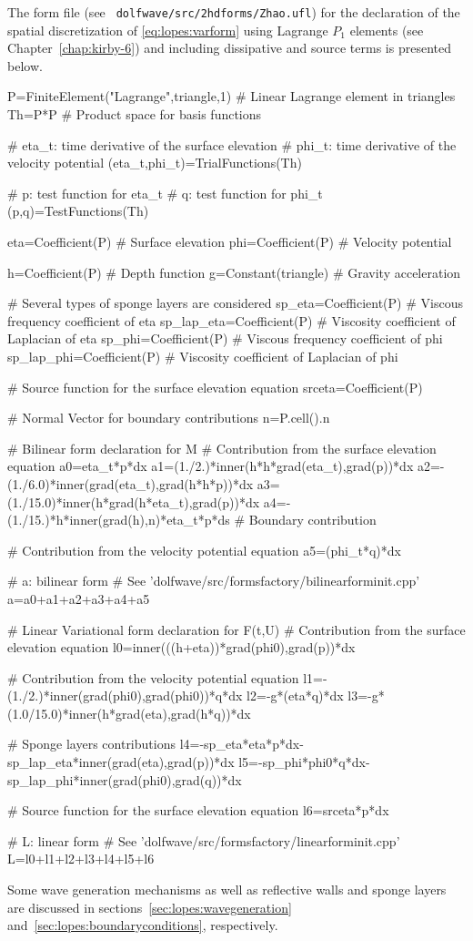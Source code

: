 The \ufl form file (see {\tt
  dolfwave/src/2hdforms/Zhao.ufl}) for the declaration of the spatial
discretization of \eqref{eq:lopes:varform} using Lagrange
$P_1$ elements (see Chapter~\ref{chap:kirby-6}) and including  dissipative and
source terms is presented below.
\begin{python}
P=FiniteElement("Lagrange",triangle,1) # Linear Lagrange element in triangles
Th=P*P # Product space for basis functions

# eta_t: time derivative of the surface elevation
# phi_t: time derivative of the velocity potential
(eta_t,phi_t)=TrialFunctions(Th)

# p: test function for eta_t
# q: test function for phi_t
(p,q)=TestFunctions(Th)

eta=Coefficient(P) # Surface elevation
phi=Coefficient(P) # Velocity potential

h=Coefficient(P) # Depth function
g=Constant(triangle) # Gravity acceleration

# Several types of sponge layers are considered
sp_eta=Coefficient(P) # Viscous frequency coefficient of eta
sp_lap_eta=Coefficient(P) # Viscosity coefficient of Laplacian of eta
sp_phi=Coefficient(P) # Viscous frequency coefficient of phi
sp_lap_phi=Coefficient(P) # Viscosity coefficient of Laplacian of phi

# Source function for the surface elevation equation
srceta=Coefficient(P)

# Normal Vector for boundary contributions
n=P.cell().n

# Bilinear form declaration for M
# Contribution from the surface elevation equation
a0=eta_t*p*dx
a1=(1./2.)*inner(h*h*grad(eta_t),grad(p))*dx
a2=-(1./6.0)*inner(grad(eta_t),grad(h*h*p))*dx
a3=(1./15.0)*inner(h*grad(h*eta_t),grad(p))*dx
a4=-(1./15.)*h*inner(grad(h),n)*eta_t*p*ds # Boundary contribution

# Contribution from the velocity potential equation
a5=(phi_t*q)*dx

# a: bilinear form
# See 'dolfwave/src/formsfactory/bilinearforminit.cpp'
a=a0+a1+a2+a3+a4+a5

# Linear Variational form declaration for F(t,U)
# Contribution from the surface elevation equation
l0=inner(((h+eta))*grad(phi0),grad(p))*dx

# Contribution from the velocity potential equation
l1=-(1./2.)*inner(grad(phi0),grad(phi0))*q*dx
l2=-g*(eta*q)*dx
l3=-g*(1.0/15.0)*inner(h*grad(eta),grad(h*q))*dx

# Sponge layers contributions
l4=-sp_eta*eta*p*dx-sp_lap_eta*inner(grad(eta),grad(p))*dx
l5=-sp_phi*phi0*q*dx-sp_lap_phi*inner(grad(phi0),grad(q))*dx

# Source function for the surface elevation equation
l6=srceta*p*dx

# L: linear form
# See 'dolfwave/src/formsfactory/linearforminit.cpp'
L=l0+l1+l2+l3+l4+l5+l6
\end{python}
Some wave generation mechanisms as well as reflective walls
 and sponge layers are discussed in
 sections~\ref{sec:lopes:wavegeneration}
 and~\ref{sec:lopes:boundaryconditions},
 respectively.

